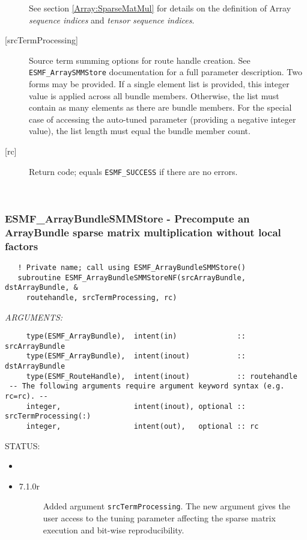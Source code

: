 \begin{description}
       See section \ref{Array:SparseMatMul} for details on the definition of 
       Array {\em sequence indices} and {\em tensor sequence indices}.
     \item [{[srcTermProcessing]}]
         Source term summing options for route handle creation. See
         {\tt ESMF\_ArraySMMStore} documentation for a full parameter description.
         Two forms may be provided. If a single element list is provided, this
         integer value is applied across all bundle members. Otherwise, the list must
         contain as many elements as there are bundle members. For the special case
         of accessing the auto-tuned parameter (providing a negative integer value),
         the list length must equal the bundle member count.
     \item [{[rc]}]
       Return code; equals {\tt ESMF\_SUCCESS} if there are no errors.
     \end{description}
   
 
\mbox{}\hrulefill\ 
 
\subsubsection [ESMF\_ArrayBundleSMMStore] {ESMF\_ArrayBundleSMMStore - Precompute an ArrayBundle sparse matrix multiplication without local factors}


  
\begin{verbatim}   ! Private name; call using ESMF_ArrayBundleSMMStore()
   subroutine ESMF_ArrayBundleSMMStoreNF(srcArrayBundle, dstArrayBundle, &
     routehandle, srcTermProcessing, rc)\end{verbatim}{\em ARGUMENTS:}
\begin{verbatim}     type(ESMF_ArrayBundle),  intent(in)              :: srcArrayBundle
     type(ESMF_ArrayBundle),  intent(inout)           :: dstArrayBundle
     type(ESMF_RouteHandle),  intent(inout)           :: routehandle
 -- The following arguments require argument keyword syntax (e.g. rc=rc). --
     integer,                 intent(inout), optional :: srcTermProcessing(:)
     integer,                 intent(out),   optional :: rc\end{verbatim}
{\sf STATUS:}
   \begin{itemize}
   \item{}
   \item{}
   \begin{description}
   \item[7.1.0r] Added argument {\tt srcTermProcessing}.
                The new argument gives the user access to the tuning parameter
                affecting the sparse matrix execution and bit-wise 
                reproducibility.
   \end{description}
   \end{itemize}
  
